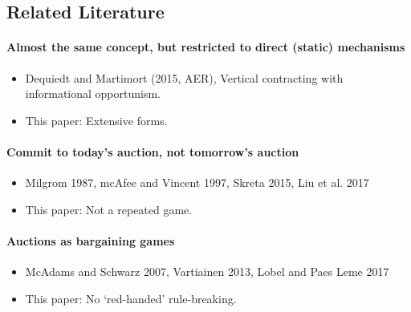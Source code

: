 \documentclass[11pt,a4paper,dvipdfmx]{article}
\theoremstyle{plain}
\newcommand{\1}{\mathbbm{1}}
\begin{document}
\subsection{Related Literature}
\paragraph{Almost the same concept, but restricted to direct (static) mechanisms}
\begin{itemize}
	\item Dequiedt and Martimort (2015, AER), Vertical contracting with informational opportunism.
	\item This paper: Extensive forms.
\end{itemize}

\paragraph{Commit to today's auction, not tomorrow's auction}
\begin{itemize}
	\item Milgrom 1987, mcAfee and Vincent 1997, Skreta 2015, Liu et al. 2017
	\item This paper: Not a repeated game.
\end{itemize}

\paragraph{Auctions as bargaining games}
\begin{itemize}
	\item McAdams and Schwarz 2007, Vartiainen 2013, Lobel and Paes Leme 2017
	\item This paper: No `red-handed' rule-breaking.
\end{itemize}


\newpage
\end{document}
